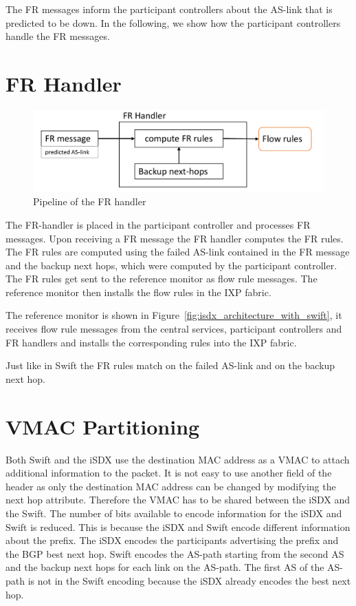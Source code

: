 The FR messages inform the participant controllers about the AS-link that is predicted to be down. In the following, we show how the participant controllers handle the FR messages.


\section{\label{chapter4:FR-handler}FR Handler}

\begin{figure}[h]
\center
\includegraphics[scale = 0.6]{Figures/design_fr_handler_cropped.pdf}
\caption{Pipeline of the FR handler}
\end{figure}

The FR-handler is placed in the participant controller and processes FR messages.
Upon receiving a FR message the FR handler computes the FR rules. The FR rules are computed using the failed AS-link contained in the FR message and the backup next hops, which were computed by the participant controller. 
The FR rules get sent to the reference monitor as flow rule messages. The reference monitor then installs the flow rules in the IXP fabric.

The reference monitor is shown in Figure~\ref{fig:isdx_architecture_with_swift}, it receives flow rule messages from the central services, participant controllers and FR handlers and installs the corresponding rules into the IXP fabric. 

Just like in Swift the FR rules match on the failed AS-link and on the backup next hop.    

\newpage

\section{\label{chapter4:vmac_partitioning}VMAC Partitioning}

Both Swift and the iSDX use the destination MAC address as a VMAC to attach additional information to the packet. It is not easy to use another field of the header as only the destination MAC address can be changed by modifying the next hop attribute. Therefore the VMAC has to be shared between the iSDX and the Swift. The number of bits available to encode information for the iSDX and Swift is reduced. This is because the iSDX and Swift encode different information about the prefix. The iSDX encodes the participants advertising the prefix and the BGP best next hop. Swift encodes the AS-path starting from the second AS and the backup next hops for each link on the AS-path. The first AS of the AS-path is not in the Swift encoding because the iSDX already encodes the best next hop. 

